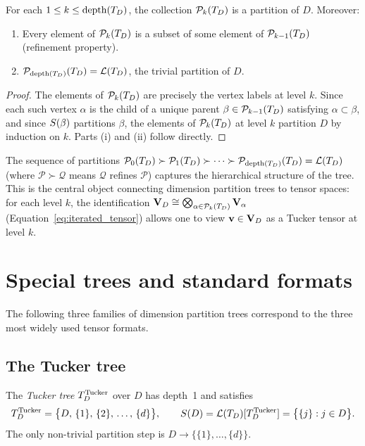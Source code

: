 \begin{proposition}
\label{prop:level_partition_is_partition}
For each $1 \leq k \leq \mathrm{depth}(T_D)$, the collection
$\mathcal{P}_{k}(T_D)$ is a partition of $D$. Moreover:
\begin{enumerate}
\item[\textup{(i)}] Every element of $\mathcal{P}_{k}(T_D)$ is a subset of
    some element of $\mathcal{P}_{k-1}(T_D)$ \textup{(}refinement property\textup{)}.
\item[\textup{(ii)}] $\mathcal{P}_{\mathrm{depth}(T_D)}(T_D) = \mathcal{L}(T_D)$, the trivial
    partition of $D$.
\end{enumerate}
\end{proposition}

\begin{proof}
The elements of $\mathcal{P}_{k}(T_D)$ are precisely the vertex labels at
level $k$. Since each such vertex $\alpha$ is the child of a unique
parent $\beta \in \mathcal{P}_{k-1}(T_D)$ satisfying $\alpha \subset \beta$,
and since $S(\beta)$ partitions $\beta$, the elements of
$\mathcal{P}_{k}(T_D)$ at level $k$ partition $D$ by induction on $k$. Parts
(i) and (ii) follow directly.
\end{proof}

The sequence of partitions
$\mathcal{P}_{0}(T_D) \succ \mathcal{P}_{1}(T_D) \succ \cdots \succ
\mathcal{P}_{\mathrm{depth}(T_D)}(T_D) = \mathcal{L}(T_D)$
(where $\mathcal{P} \succ \mathcal{Q}$ means $\mathcal{Q}$ refines
$\mathcal{P}$) captures the hierarchical structure of the tree.
This is the central object connecting dimension partition trees to
tensor spaces: for each level $k$, the identification
$\mathbf{V}_D \cong \bigotimes_{\alpha \in \mathcal{P}_{k}(T_D)} \mathbf{V}_\alpha$
(Equation~\eqref{eq:iterated_tensor}) allows one to view $\mathbf{v} \in \mathbf{V}_D$
as a Tucker tensor at level $k$.

\section{Special trees and standard formats}
\label{sec:trees:special}

The following three families of dimension partition trees correspond
to the three most widely used tensor formats.

\subsection*{The Tucker tree}

\begin{example}
\label{ex:tucker_tree}
The \emph{Tucker tree} $T_D^{\mathrm{Tucker}}$ over $D$ has depth~1 and satisfies
\begin{equation*}
    T_D^{\mathrm{Tucker}} = \bigl\{D,\, \{1\},\, \{2\},\, \ldots,\, \{d\}\bigr\},
    \qquad
    S(D) = \mathcal{L}(T_D)[T_D^{\mathrm{Tucker}}] = \bigl\{\{j\} : j \in D\bigr\}.
\end{equation*}
The only non-trivial partition step is $D \to \{\{1\},\ldots,\{d\}\}$.
\end{example}

